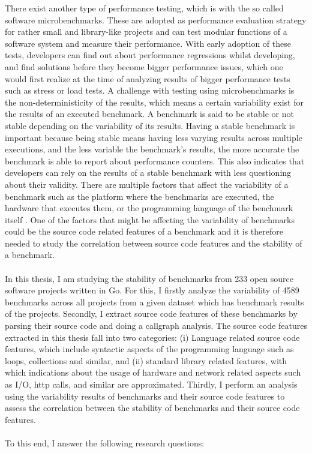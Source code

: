 \documentclass{seal_thesis}
\begin{document}
There exist another type of performance testing, which is with the so called software microbenchmarks. These are adopted as performance evaluation strategy for rather small and library-like projects\cite{laaber2019software} and can test modular functions of a software system and measure their performance\cite{costa2019}. With early adoption of these tests, developers can find out about performance regressions whilst developing, and find solutions before they become bigger performance issues, which one would first realize at the time of analyzing results of bigger performance tests such as stress or load tests. A challenge with testing using microbenchmarks is the non-deterministicity of the results, which means a certain variability exist for the results of an executed benchmark\cite{Laaber:2018:EOS:3196398.3196407}. A benchmark is said to be stable or not stable depending on the variability of its results. Having a stable benchmark is important because being stable means having less varying results across multiple executions, and the less variable the benchmark's results, the more accurate the benchmark is able to report about performance counters. This also indicates that developers can rely on the results of a stable benchmark with less questioning about their validity. There are multiple factors that affect the variability of a benchmark such as the platform where the benchmarks are executed, the hardware that executes them, or the programming language of the benchmark itself \cite{laaber2018performance}. One of the factors that might be affecting the variability of benchmarks could be the source code related features of a benchmark and it is therefore needed to study the correlation between source code features and the stability of a benchmark.\\
\\
In this thesis, I am studying the stability of benchmarks from 233 open source software projects written in Go. For this, I firstly analyze the variability of 4589 benchmarks across all projects from a given dataset which has benchmark results of the projects. Secondly, I extract source code features of these benchmarks by parsing their source code and doing a callgraph analysis. The source code features extracted in this thesis fall into two categories: (i) Language related source code features, which include syntactic aspects of the programming language such as loops, collections and similar, and (ii) standard library related features, with which indications about the usage of hardware and network related aspects such as I/O, http calls, and similar are approximated. Thirdly, I perform an analysis using the variability results of benchmarks and their source code features to assess the correlation between the stability of benchmarks and their source code features.\\
\\
To this end, I answer the following research questions: 
\end{document}
